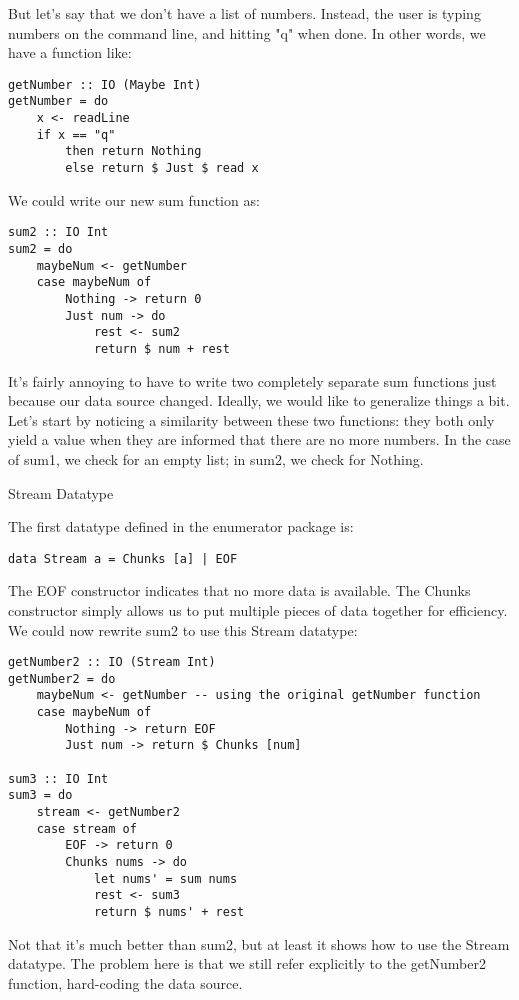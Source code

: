 But let's say that we don't have a list of numbers. Instead, the user is typing numbers on the command line, and hitting "q" when done. In other words, we have a function like:

\begin{lstlisting}
getNumber :: IO (Maybe Int)
getNumber = do
    x <- readLine
    if x == "q"
        then return Nothing
        else return $ Just $ read x
\end{lstlisting}

We could write our new sum function as:

\begin{lstlisting}
sum2 :: IO Int
sum2 = do
    maybeNum <- getNumber
    case maybeNum of
        Nothing -> return 0
        Just num -> do
            rest <- sum2
            return $ num + rest
\end{lstlisting}

It's fairly annoying to have to write two completely separate sum functions just because our data source changed. Ideally, we would like to generalize things a bit. Let's start by noticing a similarity between these two functions: they both only yield a value when they are informed that there are no more numbers. In the case of sum1, we check for an empty list; in sum2, we check for Nothing.

Stream Datatype

The first datatype defined in the enumerator package is:

\begin{lstlisting}
data Stream a = Chunks [a] | EOF
\end{lstlisting}

The EOF constructor indicates that no more data is available. The Chunks constructor simply allows us to put multiple pieces of data together for efficiency. We could now rewrite sum2 to use this Stream datatype:

\begin{lstlisting}
getNumber2 :: IO (Stream Int)
getNumber2 = do
    maybeNum <- getNumber -- using the original getNumber function
    case maybeNum of
        Nothing -> return EOF
        Just num -> return $ Chunks [num]

sum3 :: IO Int
sum3 = do
    stream <- getNumber2
    case stream of
        EOF -> return 0
        Chunks nums -> do
            let nums' = sum nums
            rest <- sum3
            return $ nums' + rest
\end{lstlisting}

Not that it's much better than sum2, but at least it shows how to use the Stream datatype. The problem here is that we still refer explicitly to the getNumber2 function, hard-coding the data source.


